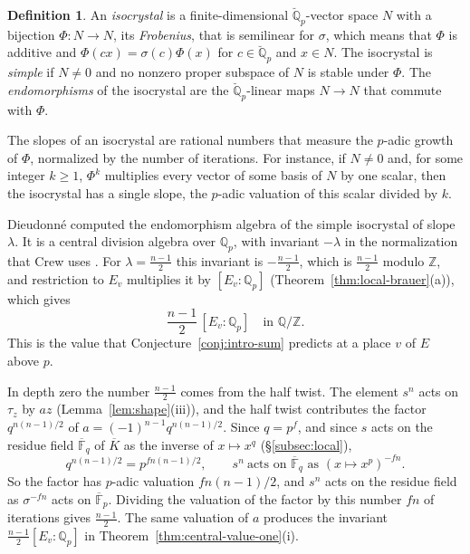 \documentclass[a4paper,11pt]{amsart}
\theoremstyle{definition}
\newtheorem*{definition*}{Definition}
\theoremstyle{remark}
\numberwithin{equation}{section}
\newcommand{\Q}{\mathbb{Q}}
\newcommand{\Z}{\mathbb{Z}}
\newcommand{\F}{\mathbb{F}}
\newcommand{\Qb}{\breve{\mathbb{Q}}_p}
\begin{document}
\begin{definition*}
An \emph{isocrystal} is a finite-dimensional $\Qb$-vector space $N$ with a bijection $\Phi\colon N\to N$, its \emph{Frobenius}, that is semilinear for $\sigma$, which means that $\Phi$ is additive and $\Phi(cx)=\sigma(c)\Phi(x)$ for $c\in\Qb$ and $x\in N$. The isocrystal is \emph{simple} if $N\neq0$ and no nonzero proper subspace of $N$ is stable under $\Phi$. The \emph{endomorphisms} of the isocrystal are the $\Qb$-linear maps $N\to N$ that commute with $\Phi$.
\end{definition*}

The slopes of an isocrystal are rational numbers that measure the $p$-adic growth of $\Phi$, normalized by the number of iterations. For instance, if $N\neq0$ and, for some integer $k\ge1$, $\Phi^k$ multiplies every vector of some basis of $N$ by one scalar, then the isocrystal has a single slope, the $p$-adic valuation of this scalar divided by $k$.

Dieudonn\'e computed the endomorphism algebra of the simple isocrystal of slope $\lambda$. It is a central division algebra over $\Q_p$, with invariant $-\lambda$ in the normalization that Crew uses \cite[Theorem~1.1.2]{Cre25}. For $\lambda=\frac{n-1}2$ this invariant is $-\frac{n-1}2$, which is $\frac{n-1}2$ modulo $\Z$, and restriction to $E_v$ multiplies it by $[E_v:\Q_p]$ (Theorem~\ref{thm:local-brauer}(a)), which gives
\[
 \frac{n-1}2\,[E_v:\Q_p]\quad\text{in }\Q/\Z.
\]
This is the value that Conjecture~\ref{conj:intro-sum} predicts at a place $v$ of $E$ above $p$.

In depth zero the number $\frac{n-1}2$ comes from the half twist. The element $s^n$ acts on $\tau_z$ by $az$ (Lemma~\ref{lem:shape}(iii)), and the half twist contributes the factor $q^{n(n-1)/2}$ of $a=(-1)^{n-1}q^{n(n-1)/2}$. Since $q=p^f$, and since $s$ acts on the residue field $\overline{\F}_q$ of $\overline K$ as the inverse of $x\mapsto x^q$ (\S\ref{subsec:local}),
\[
 q^{n(n-1)/2}=p^{fn(n-1)/2},\qquad s^n\ \text{acts on }\overline{\F}_q\text{ as }(x\mapsto x^p)^{-fn}.
\]
So the factor has $p$-adic valuation $fn(n-1)/2$, and $s^n$ acts on the residue field as $\sigma^{-fn}$ acts on $\overline{\F}_p$. Dividing the valuation of the factor by this number $fn$ of iterations gives $\frac{n-1}2$. The same valuation of $a$ produces the invariant $\frac{n-1}2[E_v:\Q_p]$ in Theorem~\ref{thm:central-value-one}(i).
\end{document}
